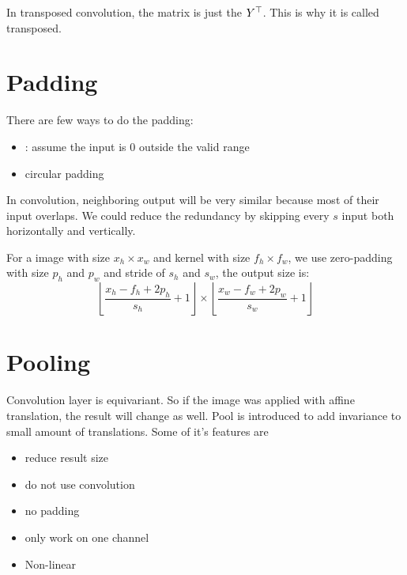 In transposed convolution, the matrix is just the ${Y}^\top$. This is why it is called transposed.



\section{Padding}

There are few ways to do the padding:
\begin{itemize}
    \item {}: assume the input is $0$ outside the valid range
    \item circular padding
\end{itemize}

\begin{definition}
    In convolution, neighboring output will be very similar because most of their input overlaps. We could reduce the redundancy by skipping every $s$ input both horizontally and vertically.
\end{definition}

\begin{theorem}
    For a image with size $x_h \times x_w$ and kernel with size $f_h \times f_w$, we use zero-padding with size $p_h$ and $p_w$ and stride of $s_h$ and $s_w$, the output size is:
    \begin{equation}
        \left\lfloor \frac{x_h - f_h + 2p_h}{s_h} + 1 \right\rfloor \times \left\lfloor \frac{x_w - f_w + 2p_w}{s_w} + 1 \right\rfloor
    \end{equation}
\end{theorem}



\section{Pooling}

Convolution layer is equivariant. So if the image was applied with affine translation, the result will change as well. Pool is introduced to add invariance to small amount of translations. Some of it's features are
\begin{itemize}
    \item reduce result size
    \item do not use convolution
    \item no padding
    \item only work on one channel
    \item Non-linear
\end{itemize}

